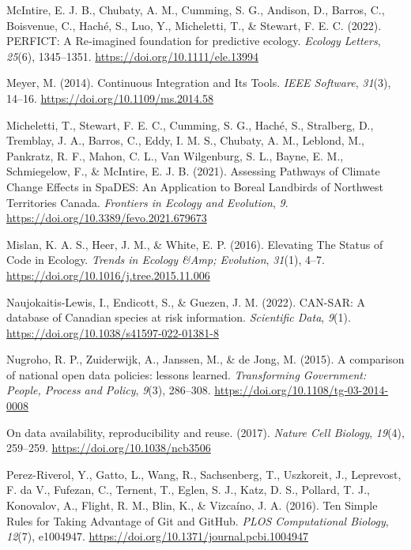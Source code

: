 \begin{CSLReferences}{1}{0}
\leavevmode{}%
McIntire, E. J. B., Chubaty, A. M., Cumming, S. G., Andison, D., Barros, C., Boisvenue, C., Haché, S., Luo, Y., Micheletti, T., \& Stewart, F. E. C. (2022). PERFICT: A Re‐imagined foundation for predictive ecology. \emph{Ecology Letters}, \emph{25}(6), 1345--1351. \url{https://doi.org/10.1111/ele.13994}

\leavevmode{}%
Meyer, M. (2014). Continuous Integration and Its Tools. \emph{IEEE Software}, \emph{31}(3), 14--16. \url{https://doi.org/10.1109/ms.2014.58}

\leavevmode{}%
Micheletti, T., Stewart, F. E. C., Cumming, S. G., Haché, S., Stralberg, D., Tremblay, J. A., Barros, C., Eddy, I. M. S., Chubaty, A. M., Leblond, M., Pankratz, R. F., Mahon, C. L., Van Wilgenburg, S. L., Bayne, E. M., Schmiegelow, F., \& McIntire, E. J. B. (2021). Assessing Pathways of Climate Change Effects in SpaDES: An Application to Boreal Landbirds of Northwest Territories Canada. \emph{Frontiers in Ecology and Evolution}, \emph{9}. \url{https://doi.org/10.3389/fevo.2021.679673}

\leavevmode{}%
Mislan, K. A. S., Heer, J. M., \& White, E. P. (2016). Elevating The Status of Code in Ecology. \emph{Trends in Ecology \&Amp; Evolution}, \emph{31}(1), 4--7. \url{https://doi.org/10.1016/j.tree.2015.11.006}

\leavevmode{}%
Naujokaitis-Lewis, I., Endicott, S., \& Guezen, J. M. (2022). CAN-SAR: A database of Canadian species at risk information. \emph{Scientific Data}, \emph{9}(1). \url{https://doi.org/10.1038/s41597-022-01381-8}

\leavevmode{}%
Nugroho, R. P., Zuiderwijk, A., Janssen, M., \& de Jong, M. (2015). A comparison of national open data policies: lessons learned. \emph{Transforming Government: People, Process and Policy}, \emph{9}(3), 286--308. \url{https://doi.org/10.1108/tg-03-2014-0008}

\leavevmode{}%
On data availability, reproducibility and reuse. (2017). \emph{Nature Cell Biology}, \emph{19}(4), 259--259. \url{https://doi.org/10.1038/ncb3506}

\leavevmode{}%
Perez-Riverol, Y., Gatto, L., Wang, R., Sachsenberg, T., Uszkoreit, J., Leprevost, F. da V., Fufezan, C., Ternent, T., Eglen, S. J., Katz, D. S., Pollard, T. J., Konovalov, A., Flight, R. M., Blin, K., \& Vizcaíno, J. A. (2016). Ten Simple Rules for Taking Advantage of Git and GitHub. \emph{PLOS Computational Biology}, \emph{12}(7), e1004947. \url{https://doi.org/10.1371/journal.pcbi.1004947}


\end{CSLReferences}
